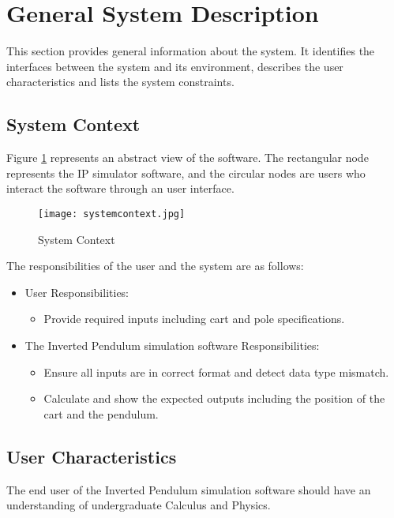 \documentclass[12pt]{article}
\begin{document}
\section{General System Description}

This section provides general information about the system.  It identifies the
interfaces between the system and its environment, describes the user
characteristics and lists the system constraints.  

\subsection{System Context}
Figure \ref{Fig_SystemContext} represents an abstract view of the software. The rectangular node represents the IP simulator software, and the circular nodes are users who interact the software through an user interface.

\begin{figure}[h!]
\begin{center}
\texttt{[image: systemcontext.jpg]}
\caption{System Context}
\label{Fig_SystemContext} 
\end{center}
\end{figure}

The responsibilities of the user and the system are as follows:
\begin{itemize}
\item User Responsibilities:
\begin{itemize}
\item Provide required inputs including cart and pole specifications.
\end{itemize}
\item The Inverted Pendulum simulation software Responsibilities:
\begin{itemize}
\item Ensure all inputs are in correct format and detect data type mismatch.
\item Calculate and show the expected outputs including the position of the cart and the pendulum.
\end{itemize}
\end{itemize}

\subsection{User Characteristics} \label{SecUserCharacteristics}

The end user of the Inverted Pendulum simulation software should have an understanding of undergraduate Calculus and Physics.
\end{document}
